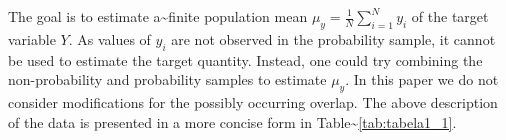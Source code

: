 \documentclass[
]{jss}
\begin{document}
The goal is to estimate a\textasciitilde finite population mean
\(\displaystyle\mu_{y}=\frac{1}{N}\sum_{i=1}^{N} y_{i}\) of the target
variable \(Y\). As values of \(y_{i}\) are not observed in the
probability sample, it cannot be used to estimate the target quantity.
Instead, one could try combining the non-probability and probability
samples to estimate \(\mu_{y}\). In this paper we do not consider
modifications for the possibly occurring overlap. The above description
of the data is presented in a more concise form in
Table\textasciitilde{}\ref{tab:tabela1_1}.

\begin{table}
\centering
\captionsetup{aboveskip=0pt, belowskip=0pt} %
\scriptsize %
\setlength{\tabcolsep}{3pt} %
\renewcommand{\arraystretch}{0.8} %
\caption{Two Sample Setting}
\label{tab:tabela1_1}
\end{table}
\end{document}
